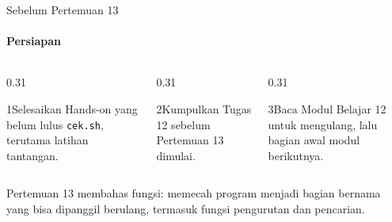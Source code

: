 \documentclass[t]{beamer}
\begin{document}
\begin{frame}{Sebelum Pertemuan 13}
\framesubtitle{Persiapan}
\begin{columns}[T]
\begin{column}{0.31\textwidth}
\begin{Langkah}{1}{Selesaikan}
Hands-on yang belum lulus \texttt{cek.sh}, terutama latihan tantangan.
\end{Langkah}
\end{column}
\begin{column}{0.31\textwidth}
\begin{Langkah}{2}{Kumpulkan}
Tugas 12 sebelum Pertemuan 13 dimulai.
\end{Langkah}
\end{column}
\begin{column}{0.31\textwidth}
\begin{Langkah}{3}{Baca}
Modul Belajar 12 untuk mengulang, lalu bagian awal modul berikutnya.
\end{Langkah}
\end{column}
\end{columns}
\vspace{10pt}
Pertemuan 13 membahas fungsi: memecah program menjadi bagian bernama yang bisa dipanggil berulang, termasuk fungsi pengurutan dan pencarian.
\end{frame}

\end{document}
